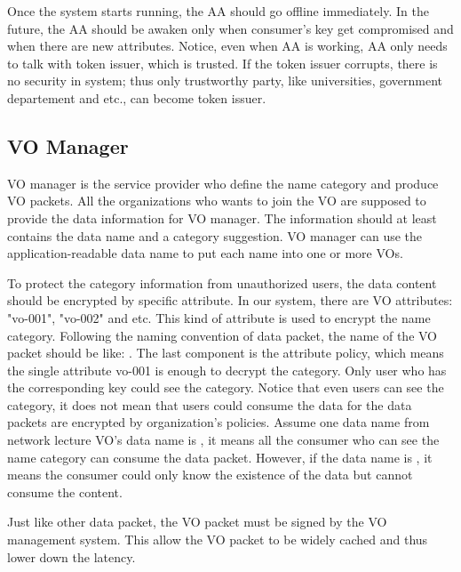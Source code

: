 Once the system starts running, the AA should go offline immediately.
In the future, the AA should be awaken only when consumer's key get compromised and when there are new attributes.
Notice, even when AA is working, AA only needs to talk with token issuer, which is trusted.
If the token issuer corrupts, there is no security in system; thus only trustworthy party, like universities, government departement and etc., can become token issuer.

\subsection{VO Manager}
VO manager is the service provider who define the name category and produce VO packets.
All the organizations who wants to join the VO are supposed to provide the data information for VO manager.
The information should at least contains the data name and a category suggestion.
VO manager can use the application-readable data name to put each name into one or more VOs.

To protect the category information from unauthorized users, the data content should be encrypted by specific attribute.
In our system, there are VO attributes: "vo-001", "vo-002" and etc.
This kind of attribute is used to encrypt the name category.
Following the naming convention of data packet, the name of the VO packet should be like: .
The last component is the attribute policy, which means the single attribute vo-001 is enough to decrypt the category.
Only user who has the corresponding key could see the category.
Notice that even users can see the category, it does not mean that users could consume the data for the data packets are encrypted by organization's policies.
Assume one data name from network lecture VO's data name is , it means all the consumer who can see the name category can consume the data packet.
However, if the data name is , it means the consumer could only know the existence of the data but cannot consume the content.

Just like other data packet, the VO packet must be signed by the VO management system.
This allow the VO packet to be widely cached and thus lower down the latency.

